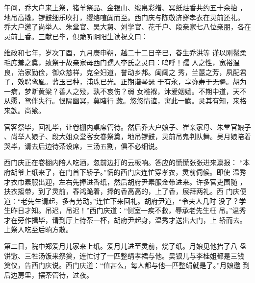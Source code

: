 午间，乔大户来上祭，猪羊祭品、金银山、缎帛彩缯、冥纸炷香共约五十余抬
，地吊高撬，锣鼓细乐吹打，缨络喧阗而至。西门庆与陈敬济穿孝衣在灵前还礼。
乔大户邀了尚举人、朱堂官、吴大舅、刘学官、花千户、段亲家七八位亲朋，各在
灵前上香。三献已毕，俱跪听阴阳生读祝文曰：

维政和七年，岁次丁酉，九月庚申朔，越二十二日辛巳，眷生乔洪等
谨以刚鬣柔毛庶羞之奠，致祭于故亲家母西门孺人李氏之灵曰：呜呼！孺
人之性，宽裕温良，治家勤俭，御众慈祥，克全妇道，誉动乡邦。闺阃之
秀，兰蕙之芳，夙配君子，效聘鸾凰。蓝玉已种，浦珠已光。正期谐琴瑟
于有永，享弥寿于无疆。胡为一病，梦断黄粱？善人之殁，孰不哀伤？弱
女襁褓，沐爱姻嫱。不期中道，天不从愿，鸳伴失行。恨隔幽冥，莫睹行
藏。悠悠情谊，寓此一觞。灵其有知，来格来歆。尚飨。

官客祭毕，回礼毕，让卷棚内桌席管待。然后乔大户娘子、崔亲家母、朱堂官娘子
、尚举人娘子、段大姐众堂客女眷祭奠，地吊锣鼓，灵前吊鬼判队舞。吴月娘陪着
哭毕，请去后边待茶设席，三汤五割，俱不必细说。

西门庆正在卷棚内陪人吃酒，忽前边打的云板响。答应的慌慌张张进来禀报：
“本府胡爷上纸来了，在门首下轿子。”慌的西门庆连忙穿孝衣，灵前伺候。即使
温秀才衣巾素服出迎，左右先捧进香纸，然后胡府尹素服金带进来。许多官吏围随
，扶衣搊带，到了灵前，春鸿跪着，捧的香高高的，上了香，展拜两礼。西
门庆便道：“老先生请起，多有劳动。”连忙下来回礼。胡府尹道，“令夫人几时
没了？学生昨日才知。吊迟，吊迟！”西门庆道：“侧室一疾不救，辱承老先生枉
吊。”温秀才在旁作揖毕，请到厅上待茶一杯，胡府尹起身，温秀才送出大门，上
轿而去。上祭人吃至后晌方散。

第二日，院中郑爱月儿家来上纸。爱月儿进至灵前，烧了纸。月娘见他抬了八
盘饼馓、三牲汤饭来祭奠，连忙讨了一匹整绢孝裙与他。吴银儿与李桂姐都是三钱
奠仪，告西门庆说。西门庆道：“值甚么，每人都与他一匹整绢就是了。”月娘邀
到后边房里，摆茶管待，过夜。

